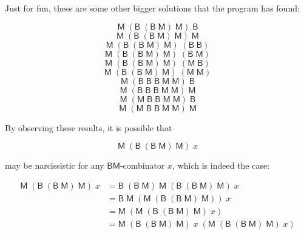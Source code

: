 \documentclass{article}
\begin{document}
Just for fun, these are some other bigger solutions 
that the program has found:

\begin{center}
  $$
    \mathsf{M}\;
      (\mathsf{B}\;(\mathsf{B}\;\mathsf{M})\;\mathsf{M})\;
      \mathsf{B}
  $$ 
  $$
    \mathsf{M}\;
      (\mathsf{B}\;(\mathsf{B}\;\mathsf{M})\;\mathsf{M})\;
      \mathsf{M}
  $$ 
  $$
    \mathsf{M}\;
      (\mathsf{B}\;(\mathsf{B}\;\mathsf{M})\;\mathsf{M})\;
      (\mathsf{B}\;\mathsf{B})
  $$ 
  $$
    \mathsf{M}\;
      (\mathsf{B}\;(\mathsf{B}\;\mathsf{M})\;\mathsf{M})\;
      (\mathsf{B}\;\mathsf{M})
  $$ 
  $$
    \mathsf{M}\;
      (\mathsf{B}\;(\mathsf{B}\;\mathsf{M})\;\mathsf{M})\;
      (\mathsf{M}\;\mathsf{B})
  $$
  $$
    \mathsf{M}\;
      (\mathsf{B}\;(\mathsf{B}\;\mathsf{M})\;\mathsf{M})\;
      (\mathsf{M}\;\mathsf{M})
  $$ 
  $$
    \mathsf{M}\;
      (\mathsf{B}\;\mathsf{B}\;\mathsf{B}\;\mathsf{M}\;\mathsf{M})\;
      \mathsf{B}
  $$
  $$
    \mathsf{M}\;
      (\mathsf{B}\;\mathsf{B}\;\mathsf{B}\;\mathsf{M}\;\mathsf{M})\;
      \mathsf{M}
  $$
  $$
    \mathsf{M}\;
      (\mathsf{M}\;\mathsf{B}\;\mathsf{B}\;\mathsf{M}\;\mathsf{M})\;
      \mathsf{B}
  $$
  $$
    \mathsf{M}\;
      (\mathsf{M}\;\mathsf{B}\;\mathsf{B}\;\mathsf{M}\;\mathsf{M})\;
      \mathsf{M}
  $$
\end{center}

By observing these results, it is possible that

$$
  \mathsf{M}\;
    (\mathsf{B}\;(\mathsf{B}\;\mathsf{M})\;\mathsf{M})\;
    x
$$  

may be narcissistic for any $\mathsf{B}\mathsf{M}$-combinator $x$, 
which is indeed the case:

\begin{align*}
    \mathsf{M}\; 
    (\mathsf{B}\;(\mathsf{B}\;\mathsf{M})\;\mathsf{M})\;
    x &= 
    \mathsf{B}\;(\mathsf{B}\;\mathsf{M})\;\mathsf{M}\;
    (\mathsf{B}\;(\mathsf{B}\;\mathsf{M})\;\mathsf{M})\; 
    x
    \\
    &=
    \mathsf{B}\;\mathsf{M}\;
    (\mathsf{M}\;
      (\mathsf{B}\;(\mathsf{B}\;\mathsf{M})\;\mathsf{M})
    )\;
    x \\ 
    &= 
    \mathsf{M}\; 
    (\mathsf{M}\;(
      \mathsf{B}\;(\mathsf{B}\;\mathsf{M})\;\mathsf{M}
    )\;x) \\ 
    &= 
    \mathsf{M}\;
    (\mathsf{B}\;(\mathsf{B}\;\mathsf{M})\;\mathsf{M})\;
    x\; 
    (\mathsf{M}\;
    (\mathsf{B}\;(\mathsf{B}\;\mathsf{M})\;\mathsf{M})\;
    x) \\ 
\end{align*}
\end{document}
